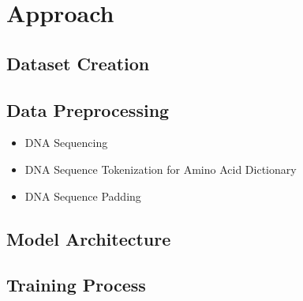 \section{Approach}  \label{approach}

\subsection{Dataset Creation}  \label{ch:approachA}

\subsection{Data Preprocessing}  \label{ch:approachB}

\begin{itemize}
	\item DNA Sequencing
	\item DNA Sequence Tokenization for Amino Acid Dictionary
	\item DNA Sequence Padding
\end{itemize}

\subsection{Model Architecture}  \label{ch:approachC}



\subsection{Training Process} \label{ch:approachD}


\newpage
